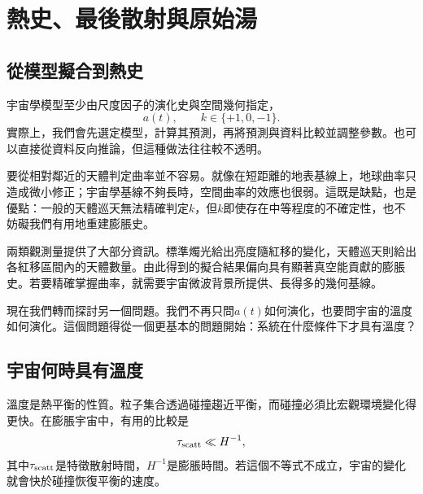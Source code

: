 \chapter{熱史、最後散射與原始湯}


\section{從模型擬合到熱史}

宇宙學模型至少由尺度因子的演化史與空間幾何指定，
\begin{equation}
a(t),
\qquad
k\in\{+1,0,-1\}.
\end{equation}
實際上，我們會先選定模型，計算其預測，再將預測與資料比較並調整參數。也可以直接從資料反向推論，但這種做法往往較不透明。

要從相對鄰近的天體判定曲率並不容易。就像在短距離的地表基線上，地球曲率只造成微小修正；宇宙學基線不夠長時，空間曲率的效應也很弱。這既是缺點，也是優點：一般的天體巡天無法精確判定\(k\)，但\(k\)即使存在中等程度的不確定性，也不妨礙我們有用地重建膨脹史。

兩類觀測量提供了大部分資訊。標準燭光給出亮度隨紅移的變化，天體巡天則給出各紅移區間內的天體數量。由此得到的擬合結果偏向具有顯著真空能貢獻的膨脹史。若要精確掌握曲率，就需要宇宙微波背景所提供、長得多的幾何基線。

現在我們轉而探討另一個問題。我們不再只問\(a(t)\)如何演化，也要問宇宙的溫度如何演化。這個問題得從一個更基本的問題開始：系統在什麼條件下才具有溫度？

\section{宇宙何時具有溫度}

溫度是熱平衡的性質。粒子集合透過碰撞趨近平衡，而碰撞必須比宏觀環境變化得更快。在膨脹宇宙中，有用的比較是
\begin{equation}
\tau_{\rm scatt}\ll H^{-1},
\label{eq:c07-equilibrium-condition}
\end{equation}
其中\(\tau_{\rm scatt}\)是特徵散射時間，\(H^{-1}\)是膨脹時間。若這個不等式不成立，宇宙的變化就會快於碰撞恢復平衡的速度。

